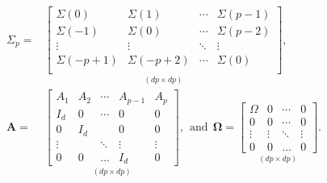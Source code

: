 \documentclass[nojss]{jss} %
\begin{document}
\begin{align}\label{eq:gausmatrices}
\begin{aligned}
\Sigma_p = &
\underset{(dp\times dp)}{\begin{bmatrix}
\Sigma(0) &  \Sigma(1) & \cdots & \Sigma(p-1) \\
\Sigma(-1) &  \Sigma(0) & \cdots & \Sigma(p-2) \\
\vdots        &   \vdots   & \ddots & \vdots  \\
\Sigma(-p+1) &  \Sigma(-p+2) & \cdots & \Sigma(0) \\
\end{bmatrix}},
\\
\boldsymbol{A} = &
\underset{(dp\times dp)}{\begin{bmatrix}
A_1 & A_2 & \cdots & A_{p-1} & A_p \\
I_d  & 0     & \cdots & 0            & 0 \\
0     & I_d  &             & 0            & 0 \\
\vdots &   & \ddots & \vdots    & \vdots \\
0     & 0     & \hdots & I_d         & 0
\end{bmatrix}},
\ \ \text{and} \ \
\boldsymbol{\Omega} =
\underset{(dp\times dp)}{\begin{bmatrix}
\Omega & 0 & \cdots & 0  \\
0            & 0 & \cdots & 0   \\
\vdots    &  \vdots & \ddots & \vdots \\
0            & 0 & \hdots &  0
\end{bmatrix}}.
\end{aligned}
\end{align}
\end{document}
